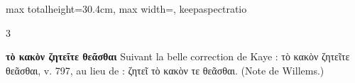 \documentclass[11pt,twoside]{book}
\newcommand{\currHeadLE}{}
\newcommand{\currHeadRE}{}
\newcommand{\currHeadLO}{}
\newcommand{\currHeadRO}{}
\newcommand{\R}{\textbf{R}}
\begin{document}
\begin{adjustbox}{max totalheight=30.4cm, max width=\textwidth, keepaspectratio}
\begin{minipage}{\textwidth}
{\begin{multicols}{3}
\par\vspace{1.5pt}
 \textbf{τὸ κακὸν ζητεῖτε θεᾶσθαι} Suivant la belle correction de Kaye : τὸ κακὸν ζητεῖτε θεᾶσθαι, v. 797, au lieu de : ζητεῖ τὸ κακὸν τε θεᾶσθαι. (Note de Willems.)
\par\end{multicols}}
\end{minipage}\end{adjustbox}
\clearpage\ifodd\value{page}\hbox{}\newpage\fi
\renewcommand{\currHeadLE}{ΑΡΙΣΤΟΦΑΝΟΥΣ ΘΕΣΜΟΦΟΡΙΑΖΟΥΣΑΙ · CODEX RAVENNAS 429 (\R)}
\renewcommand{\currHeadRE}{Folio f. 172r (Classense 174r) · vv. 800–837}
\renewcommand{\currHeadLO}{FAC-SIMILÉ DU CODEX RAVENNAS 429 (\R) · f. 172r (Classense 174r)}
\renewcommand{\currHeadRO}{vv. 800–837 · Planche recadrée sur la zone écrite et harmonisée}
\end{document}
